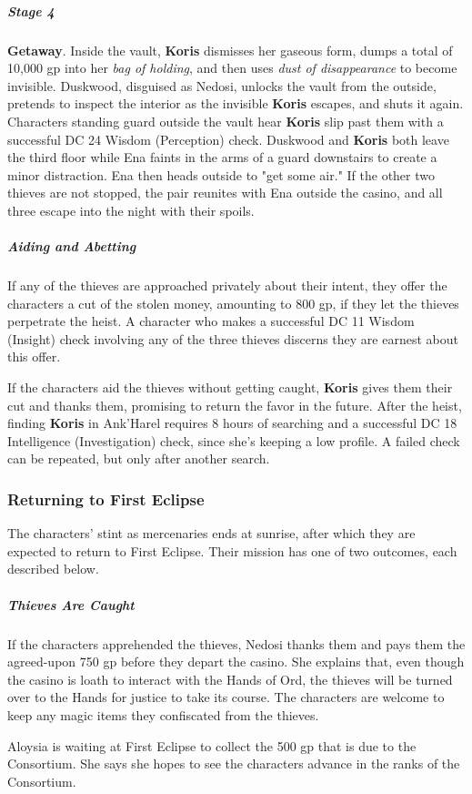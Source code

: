 \documentclass[10pt,a4paper,twoside,fancy,bg=print,twocolumn,openany,nodeprecatedcode]{dndbook}
\begin{document}
\subparagraph{Stage 4}
\textbf{Getaway}. Inside the vault, \textbf{Koris} dismisses her gaseous form, dumps a total of 10,000 gp into her \textit{bag of holding}, and then uses \textit{dust of disappearance} to become invisible. Duskwood, disguised as Nedosi, unlocks the vault from the outside, pretends to inspect the interior as the invisible \textbf{Koris} escapes, and shuts it again. Characters standing guard outside the vault hear \textbf{Koris} slip past them with a successful DC 24 Wisdom (Perception) check. Duskwood and \textbf{Koris} both leave the third floor while Ena faints in the arms of a guard downstairs to create a minor distraction. Ena then heads outside to "get some air." If the other two thieves are not stopped, the pair reunites with Ena outside the casino, and all three escape into the night with their spoils.

\subparagraph{Aiding and Abetting}
If any of the thieves are approached privately about their intent, they offer the characters a cut of the stolen money, amounting to 800 gp, if they let the thieves perpetrate the heist. A character who makes a successful DC 11 Wisdom (Insight) check involving any of the three thieves discerns they are earnest about this offer.

If the characters aid the thieves without getting caught, \textbf{Koris} gives them their cut and thanks them, promising to return the favor in the future. After the heist, finding \textbf{Koris} in Ank'Harel requires 8 hours of searching and a successful DC 18 Intelligence (Investigation) check, since she's keeping a low profile. A failed check can be repeated, but only after another search.

\subsubsection{Returning to First Eclipse}
The characters' stint as mercenaries ends at sunrise, after which they are expected to return to First Eclipse. Their mission has one of two outcomes, each described below.

\subparagraph{Thieves Are Caught}
If the characters apprehended the thieves, Nedosi thanks them and pays them the agreed-upon 750 gp before they depart the casino. She explains that, even though the casino is loath to interact with the Hands of Ord, the thieves will be turned over to the Hands for justice to take its course. The characters are welcome to keep any magic items they confiscated from the thieves.

Aloysia is waiting at First Eclipse to collect the 500 gp that is due to the Consortium. She says she hopes to see the characters advance in the ranks of the Consortium.
\end{document}
